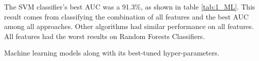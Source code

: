 The SVM classifier’s best AUC was a 91.3\%, as shown in table \ref{tab:1_ML}. This result comes from classifying the combination of all features and the best AUC among all approaches. Other algorithms had similar performance on all features. All features had the worst results on Random Forests Classifiers.






 


\begin{center}
	\begin{table}[!t]
	\centering
	\caption{Machine learning models along with its best-tuned hyper-parameters.}
	\label{tab:1_ML}
	
	\end{table}
\end{center}

